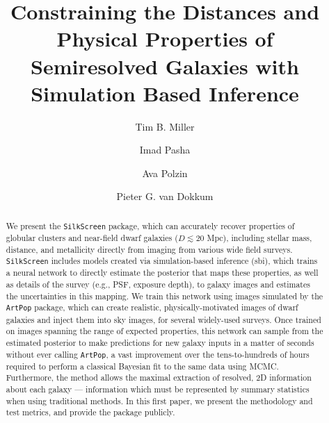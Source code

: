 \documentclass[twocolumn]{aastex631}
\newcommand{\code}[0]{\texttt{SilkScreen}}
\newcommand{\artpop}[0]{\texttt{ArtPop}}
\begin{document}
\title{Constraining the Distances and Physical Properties of Semiresolved Galaxies with Simulation Based Inference}

\author[0000-0001-8367-6265]{Tim B. Miller}

\author{Imad Pasha}

\author[0000-0002-5283-933X]{Ava Polzin}

\author{Pieter G. van Dokkum}


\begin{abstract}
We present the \code{} package, which can accurately recover properties of globular clusters and near-field dwarf galaxies ($D\lesssim 20$ Mpc), including stellar mass, distance, and metallicity directly from imaging from various wide field surveys. \code{} includes models created via simulation-based inference (sbi), which trains a neural network to directly estimate the posterior that maps these properties, as well as details of the survey (e.g., PSF, exposure depth), to galaxy images and estimates the uncertainties in this mapping. We train this network using images simulated by the \artpop{} package, which can create realistic, physically-motivated images of dwarf galaxies and inject them into sky images, for several widely-used surveys. Once trained on images spanning the range of expected properties, this network can sample from the estimated posterior to make predictions for new galaxy inputs in a matter of seconds without ever calling \artpop{}, a vast improvement over the tens-to-hundreds of hours required to perform a classical Bayesian fit to the same data using MCMC. Furthermore, the method allows the maximal extraction of resolved, 2D information about each galaxy --- information which must be represented by summary statistics when using traditional methods. In this first paper, we present the methodology and test metrics, and provide the package publicly. 

\end{abstract}
\end{document}
